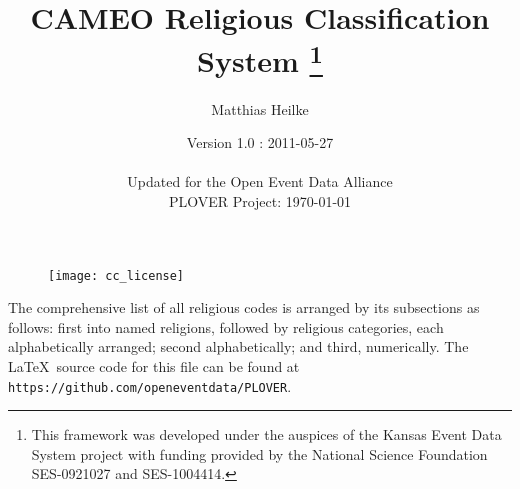 \documentclass[12pt]{article}
\title{CAMEO Religious Classification System
\thanks{ This framework was developed under the auspices of the Kansas Event Data System project with funding provided by the National Science Foundation SES-0921027 and SES-1004414.}}
\author{Matthias Heilke  }
\date{Version 1.0 : 2011-05-27 \\~\\Updated for the Open Event Data Alliance\\ PLOVER Project: \today}
\begin{document}
\maketitle

\begin{figure}[h!]
\centering
\texttt{[image: cc\_license]}
\end{figure}

\newpage


The comprehensive list of all religious codes is arranged by its subsections as follows: first into named religions, followed by religious categories, each alphabetically arranged; second alphabetically; and third, numerically.  The \LaTeX ~source code for this file can be found at \texttt{https://github.com/openeventdata/PLOVER}.
\end{document}
